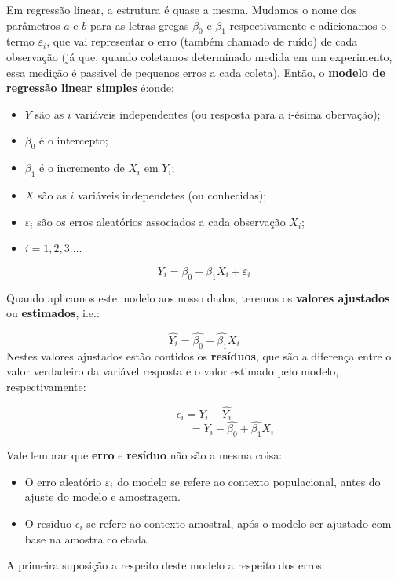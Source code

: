 \documentclass[
]{article}
\providecommand{\tightlist}{%
  \setlength{\itemsep}{0pt}\setlength{\parskip}{0pt}}
\begin{document}
Em regressão linear, a estrutura é quase a mesma. Mudamos o nome dos
parâmetros \(a\) e \(b\) para as letras gregas \(\beta_0\) e \(\beta_1\)
respectivamente e adicionamos o termo \(\varepsilon_i\), que vai
representar o erro (também chamado de ruído) de cada observação (já que,
quando coletamos determinado medida em um experimento, essa medição é
passivel de pequenos erros a cada coleta). Então, o \textbf{modelo de
regressão linear simples} é:onde:

\begin{itemize}
\tightlist
\item
  \(Y\) são as \(i\) variáveis independentes (ou resposta para a i-ésima
  obervação);\\
\item
  \(\beta_0\) é o intercepto;\\
\item
  \(\beta_1\) é o incremento de \(X_i\) em \(Y_i\);
\item
  \(X\) são as \(i\) variáveis independetes (ou conhecidas);
\item
  \(\varepsilon_i\) são os erros aleatórios associados a cada observação
  \(X_i\);
\item
  \(i=1,2,3...\).
\end{itemize}

\[Y_i =\beta_0+\beta_1X_i + \varepsilon_i\]

Quando aplicamos este modelo aos nosso dados, teremos os \textbf{valores
ajustados} ou \textbf{estimados}, i.e.:

\[\hat{Y_i}= \hat{\beta_0}+\hat{\beta_1}X_i\] Nestes valores ajustados
estão contidos os \textbf{resíduos}, que são a diferença entre o valor
verdadeiro da variável resposta e o valor estimado pelo modelo,
respectivamente:

\[\epsilon_i=Y_i-\hat{Y_i}\]
\[\qquad\qquad\quad=Y_i-\hat{\beta_0}+\hat{\beta_1}X_i\]

Vale lembrar que \textbf{erro} e \textbf{resíduo} não são a mesma coisa:

\begin{itemize}
\tightlist
\item
  O erro aleatório \(\varepsilon_i\) do modelo se refere ao contexto
  populacional, antes do ajuste do modelo e amostragem.
\item
  O resíduo \(\epsilon_i\) se refere ao contexto amostral, após o modelo
  ser ajustado com base na amostra coletada.
\end{itemize}

A primeira suposição a respeito deste modelo a respeito dos erros:
\end{document}
